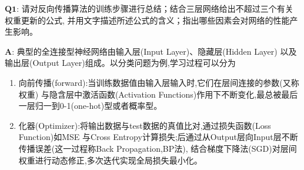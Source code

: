 \documentclass[homework]{IEEEtran}
\begin{document}
\begin{CJK}{UTF8}{gkai}
$\mathbf{Q1}$: 请对反向传播算法的训练步骤进行总结；结合三层网络给出不超过三个有关权重更新的公式,
并用文字描述所述公式的含义；指出哪些因素会对网络的性能产生影响。 \par
$\mathbf{A}$: 典型的全连接型神经网络由输入层(Input Layer)、隐藏层(Hidden Layer)
以及输出层(Output Layer)组成。以分类问题为例,学习过程可以分为
\begin{enumerate}
    \item 向前传播(forward):当训练数据值由输入层输入时,它们在层间连接的参数(又称权重)
    与隐含层中激活函数(Activation Functions)作用下不断变化,最总被最后一层归一到0-1(one-hot)型或者概率型。
    \item 化器(Optimizer):将输出数据与test数据的真值比对,通过损失函数(Loss Function)如MSE
    与Cross Entropy计算损失;后通过从Output层向Input层不断传播误差(这一过程称Back Propagation,BP法),
    结合梯度下降法(SGD)对层间权重进行动态修正,多次迭代实现全局损失最小化。
\end{enumerate}


\end{CJK}
\end{document}
